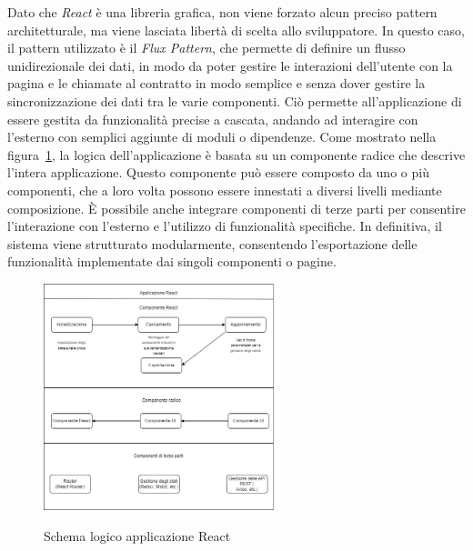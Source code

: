 Dato che \textit{React} è una libreria grafica, non viene forzato alcun preciso pattern architetturale, ma viene lasciata libertà di scelta allo sviluppatore.
In questo caso, il pattern utilizzato è il \textit{Flux Pattern}, che permette di definire un flusso unidirezionale dei dati, in modo da poter gestire
le interazioni dell'utente con la pagina e le chiamate al contratto in modo semplice e senza dover gestire la sincronizzazione dei dati tra le varie componenti.
Ciò permette all'applicazione di essere gestita da funzionalità precise a cascata, andando ad interagire con l'esterno con semplici aggiunte di moduli o dipendenze.
Come mostrato nella figura~\ref{fig:react}, la logica dell'applicazione è basata su un componente radice che descrive l'intera applicazione.
Questo componente può essere composto da uno o più componenti, che a loro volta possono essere innestati a diversi livelli mediante composizione. 
È possibile anche integrare componenti di terze parti per consentire l'interazione con l'esterno e l'utilizzo di funzionalità specifiche. 
In definitiva, il sistema viene strutturato modularmente, consentendo l'esportazione delle funzionalità implementate dai singoli componenti o pagine. \\

\begin{figure}[ht]
    \centering
    \includegraphics[width=0.6\textwidth, alt={Descrizione dello schema logico di un'applicazione React}]{immagini/react.jpeg}
    \caption{Schema logico applicazione React}\label{fig:react}
\end{figure}

